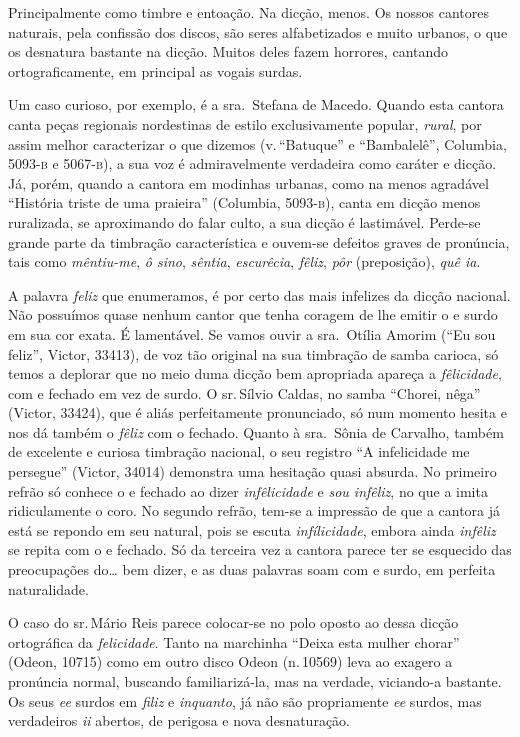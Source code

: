 Principalmente como timbre e entoação. Na dicção, menos. Os nossos
cantores naturais, pela confissão dos discos, são seres alfabetizados e
muito urbanos, o que os desnatura bastante na dicção. Muitos deles fazem
horrores, cantando ortograficamente, em principal as vogais surdas.

Um caso curioso, por exemplo, é a sra.\, Stefana de Macedo. Quando esta
cantora canta peças regionais nordestinas de estilo exclusivamente
popular, \textit{rural}, por assim melhor caracterizar o que dizemos (v.\,``Batuque'' e ``Bambalelê'', Columbia, 5093-\textsc{b} e 5067-\textsc{b}), a sua voz é
admiravelmente verdadeira como caráter e dicção. Já, porém, quando a
cantora em modinhas urbanas, como na menos agradável ``História triste
de uma praieira'' (Columbia, 5093-\textsc{b}), canta em dicção menos ruralizada,
se aproximando do falar culto, a sua dicção é lastimável. Perde-se
grande parte da timbração característica e ouvem-se defeitos graves de
pronúncia, tais como \textit{mêntiu-me}, \textit{ô sino}, \textit{sêntia},
\textit{escurêcia}, \textit{fêliz}, \textit{pôr} (preposição), \textit{quê ia}.

A palavra \textit{feliz} que enumeramos, é por certo das mais infelizes da
dicção nacional. Não possuímos quase nenhum cantor que tenha coragem de
lhe emitir o e surdo em sua cor exata. É lamentável. Se vamos ouvir a
sra.\, Otília Amorim (``Eu sou feliz'', Victor, 33413), de voz tão original na
sua timbração de samba carioca, só temos a deplorar que no meio duma
dicção bem apropriada apareça a \textit{fêlicidade}, com e fechado em vez de
surdo. O sr.\,Sílvio Caldas, no samba ``Chorei, nêga'' (Victor, 33424),
que é aliás perfeitamente pronunciado, só num momento hesita e nos dá
também o \textit{fêliz} com o fechado. Quanto à sra.\, Sônia de Carvalho,
também de excelente e curiosa timbração nacional, o seu registro ``A
infelicidade me persegue'' (Victor, 34014) demonstra uma hesitação quasi
absurda. No primeiro refrão só conhece o e fechado ao dizer
\textit{infêlicidade} e \textit{sou infêliz}, no que a imita ridiculamente o coro.
No segundo refrão, tem-se a impressão de que a cantora já está se
repondo em seu natural, pois se escuta \textit{infílicidade}, embora ainda
\textit{infêliz} se repita com o e fechado. Só da terceira vez a cantora
parece ter se esquecido das preocupações do\ldots{} bem dizer, e as duas
palavras soam com e surdo, em perfeita naturalidade.

O caso do sr.\,Mário Reis parece colocar-se no polo oposto ao dessa
dicção ortográfica da \textit{felicidade}. Tanto na marchinha ``Deixa esta
mulher chorar'' (Odeon, 10715) como em outro disco Odeon (n.\,10569) leva
ao exagero a pronúncia normal, buscando familiarizá-la, mas na verdade,
viciando-a bastante. Os seus \textit{ee} surdos em \textit{filiz} e \textit{inquanto}, já
não são propriamente \textit{ee} surdos, mas verdadeiros \textit{ii} abertos, de perigosa
e nova desnaturação.

